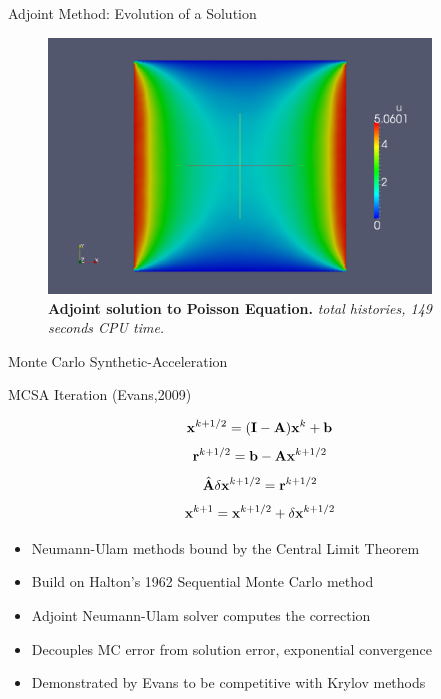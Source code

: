 \documentclass{beamer}
\begin{document}
\begin{frame}{Adjoint Method: Evolution of a Solution}

  \begin{figure}[h!]
    \begin{center}
      \includegraphics[width=4in]{adjoint_10000000.png}
    \end{center}
    \caption{\textbf{Adjoint solution to Poisson Equation.}
      \textit{ total histories, 149 seconds CPU time.} }
  \end{figure}

\end{frame}

\begin{frame}{Monte Carlo Synthetic-Acceleration}

  \begin{beamerboxesrounded}[upper=boxheadcolor,lower=boxbodycolor,shadow=true]
    {MCSA Iteration (Evans,2009)}

    \[
    \mathbf{x}^{k+1/2} = (\mathbf{I} - \mathbf{A})\mathbf{x}^k + \mathbf{b}
    \]
    \[
    \mathbf{r}^{k+1/2} = \mathbf{b} - \mathbf{A}\mathbf{x}^{k+1/2}
    \]
    \[
    \hat{\mathbf{A}}\delta\mathbf{x}^{k+1/2} = \mathbf{r}^{k+1/2}
    \]
    \[
    \mathbf{x}^{k+1} = \mathbf{x}^{k+1/2} + \delta \mathbf{x}^{k+1/2}
    \]

  \end{beamerboxesrounded}

  \medskip \medskip
  \begin{itemize}
  \item Neumann-Ulam methods bound by the Central Limit Theorem
  \item Build on Halton's 1962 Sequential Monte Carlo method
  \item Adjoint Neumann-Ulam solver computes the correction
  \item Decouples MC error from solution error, exponential convergence
  \item Demonstrated by Evans to be competitive with Krylov methods
  \end{itemize}

\end{frame}
\end{document}
